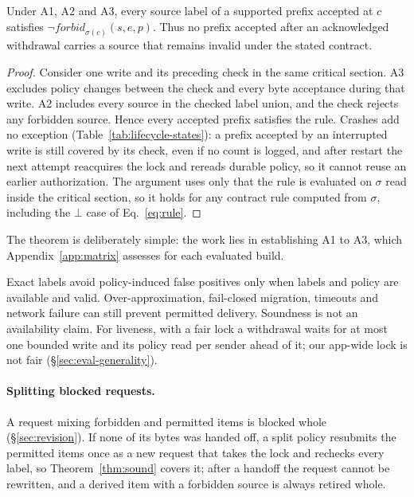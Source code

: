 \begin{theorem}\label{thm:sound}
Under A1, A2 and A3, every source label of a supported prefix accepted at $c$ satisfies
$\neg\mathit{forbid}_{\sigma(c)}(s,e,p)$. Thus no prefix accepted after an acknowledged
withdrawal carries a source that remains invalid under the stated contract.
\end{theorem}
\begin{proof}
Consider one write and its preceding check in the same critical section. A3 excludes
policy changes between the check and every byte acceptance during that write. A2
includes every source in the checked label union, and the check rejects any forbidden
source. Hence every accepted prefix satisfies the rule. Crashes add no exception
(Table~\ref{tab:lifecycle-states}): a prefix accepted by an interrupted write is still
covered by its check, even if no count is logged, and after restart the next attempt
reacquires the lock and rereads durable policy, so it cannot reuse an earlier authorization. The argument uses only
that the rule is evaluated on $\sigma$ read inside the critical section, so it holds for any contract rule computed from
$\sigma$, including the $\bot$ case of Eq.~\ref{eq:rule}.
\end{proof}
The theorem is deliberately simple: the work lies in establishing A1 to A3, which Appendix~\ref{app:matrix} assesses for
each evaluated build.

Exact labels avoid policy-induced false positives only when labels and policy are
available and valid. Over-approximation, fail-closed migration, timeouts and network
failure can still prevent permitted delivery. Soundness is not an availability claim. For liveness, with a fair lock a
withdrawal waits for at most one bounded write and its policy read per sender ahead of it; our app-wide lock is not fair
(\S\ref{sec:eval-generality}).

\paragraph{Splitting blocked requests.} A request mixing forbidden and permitted items is blocked whole
(\S\ref{sec:revision}). If none of its bytes was handed off, a split policy resubmits the permitted items once as a new
request that takes the lock and rechecks every label, so Theorem~\ref{thm:sound} covers it; after a handoff the request
cannot be rewritten, and a derived item with a forbidden source is always retired whole.

